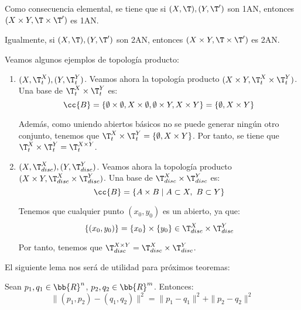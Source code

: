 \begin{observacion}
    Como consecuencia elemental, se tiene que si $(X,\T),(Y,\T')$ son 1AN, entonces $(X\times Y, \T\times \T')$ es 1AN.

    Igualmente, si $(X,\T),(Y,\T')$ son 2AN, entonces $(X\times Y, \T\times \T')$ es 2AN.
\end{observacion}

\begin{ejemplo} Veamos algunos ejemplos de topología producto:
    \begin{enumerate}
        \item $(X,\T_t^X), (Y,\T_t^Y)$. Veamos ahora la topología producto $(X\times Y, \T_t^X\times \T_t^Y)$. Una base de $\T_t^X\times \T_t^Y$ es:
        \begin{equation*}
            \cc{B}=\{\emptyset\times \emptyset, X\times \emptyset, \emptyset\times Y, X\times Y\}=\{\emptyset, X\times Y\}
        \end{equation*}

        Además, como uniendo abiertos básicos no se puede generar ningún otro conjunto, tenemos que $\T_t^X\times \T^Y_t=\{\emptyset, X\times Y\}$. Por tanto, se tiene que $\T_t^X\times \T_t^Y=\T_t^{X\times Y}$.

        \item $(X,\T_{disc}^X), (Y,\T_{disc}^Y)$. Veamos ahora la topología producto $(X\times Y, \T_{disc}^X\times \T_{disc}^Y)$. Una base de $\T_{disc}^X\times \T_{disc}^Y$ es:
        \begin{equation*}
            \cc{B}=\{A\times B\mid A\subset X,~B\subset Y\}
        \end{equation*}
        
        Tenemos que cualquier punto $(x_0,y_0)$  es un abierto, ya que:
        \begin{equation*}
            \{(x_0,y_0)\} = \{x_0\}\times \{y_0\}\in \T_{disc}^X\times \T_{disc}^Y
        \end{equation*}

        Por tanto, tenemos que $\T_{disc}^{X\times Y}=\T_{disc}^X\times \T_{disc}^Y$.
    \end{enumerate}
\end{ejemplo}


El siguiente lema nos será de utilidad para próximos teoremas:
\begin{lema}
    Sean $p_1,q_1\in \bb{R}^n$, $p_2,q_2\in \bb{R}^m$. Entonces:
    \begin{equation*}
        \|(p_1,p_2) - (q_1, q_2)\|^2 = \|p_1-q_1\|^2 + \|p_2-q_2\|^2
    \end{equation*}
\end{lema}

